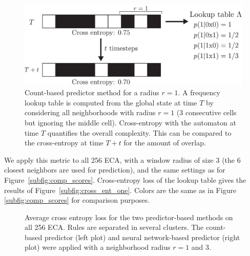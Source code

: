 \begin{figure}[htbp]
  \centering
  \includegraphics[width=.7\linewidth]{figures/schema-count}
  \caption{Count-based predictor method for a radius $r=1$. A
    frequency lookup table is computed from the global state at time $T$ by
    considering all neighborhoods with radius $r=1$ (3 consecutive cells
    but ignoring the middle cell). Cross-entropy with the automaton at time $T$
    quantifies the overall complexity. This can be compared to the cross-entropy
    at time $T + t$ for the amount of overlap.}
  \label{fig:schema-count}
\end{figure}

We apply this metric to all 256 ECA, with a window radius of size 3 (the 6
closest neighbors are used for prediction), and the same settings as for
Figure~\ref{subfig:comp_scores}. Cross-entropy loss of the lookup table gives
the results of Figure~\ref{subfig:cross_ent_one}. Colors are the same as in
Figure \ref{subfig:comp_scores} for comparison purposes.

\begin{figure}[htbp]
  \centering
  \hfil
  \caption{Average cross entropy loss for the two predictor-based methods on all
    256 ECA. Rules are separated in several clusters. The
    count-based predictor (left plot) and neural network-based predictor (right
    plot) were applied with a neighborhood radius $r=1$ and $3$.}
\end{figure}

